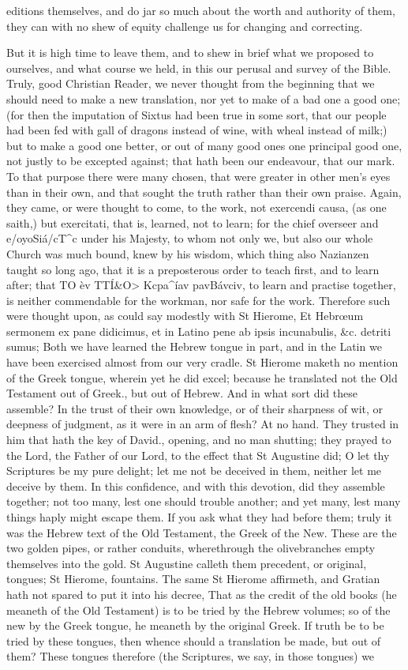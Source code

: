editions themselves, and do jar so much about the worth and authority of them, they can with no shew of equity challenge us for changing and correcting.

But it is high time to leave them, and to shew in brief what we proposed to ourselves, and what course we held, in this our perusal and survey of the Bible. Truly, good Christian Reader, we never thought from the beginning that we should need to make a new translation, nor yet to make of a bad one a good one; (for then the imputation of Sixtus had been true in some sort, that our people had been fed with gall of dragons instead of wine, with wheal instead of milk;) but to make a good one better, or out of many good ones one principal good one, not justly to be excepted against; that hath been our endeavour, that our mark. To that purpose there were many chosen, that were greater in other men's eyes than in their own, and that sought the truth rather than their own praise. Again, they came, or were thought to come, to the work, not exercendi causa, (as one saith,) but exercitati, that is, learned, not to learn; for the chief overseer and e/oyoSiá/cT^c under his Majesty, to whom not only we, but also our whole Church was much bound, knew by his wisdom, which thing also Nazianzen taught so long ago, that it is a preposterous order to teach first, and to learn after; that TO èv TTÍ&O> Kcpa^íav pavBávciv, to learn and practise together, is neither commendable for the workman, nor safe for the work. Therefore such were thought upon, as could say modestly with St Hierome, Et Hebrœum sermonem ex pane didicimus, et in Latino pene ab ipsis incunabulis, &c. detriti sumus; Both we have learned the Hebrew tongue in part, and in the Latin we have been exercised almost from our very cradle. St Hierome maketh no mention of the Greek tongue, wherein yet he did excel; because he translated not the Old Testament out of Greek., but out of Hebrew. And in what sort did these assemble? In the trust of their own knowledge, or of their sharpness of wit, or deepness of judgment, as it were in an arm of flesh? At no hand. They trusted in him that hath the key of David., opening, and no man shutting; they prayed to the Lord, the Father of our Lord, to the effect that St Augustine did; O let thy Scriptures be my pure delight; let me not be deceived in them, neither let me deceive by them. In this confidence, and with this devotion, did they assemble together; not too many, lest one should trouble another; and yet many, lest many things haply might escape them. If you ask what they had before them; truly it was the Hebrew text of the Old Testament, the Greek of the New. These are the two golden pipes, or rather conduits, wherethrough the olivebranches empty themselves into the gold. St Augustine calleth them precedent, or original, tongues; St Hierome, fountains. The same St Hierome affirmeth, and Gratian hath not spared to put it into his decree, That as the credit of the old books (he meaneth of the Old Testament) is to be tried by the Hebrew volumes; so of the new by the Greek tongue, he meaneth by the original Greek. If truth be to be tried by these tongues, then whence should a translation be made, but out of them? These tongues therefore (the Scriptures, we say, in those tongues) we 
